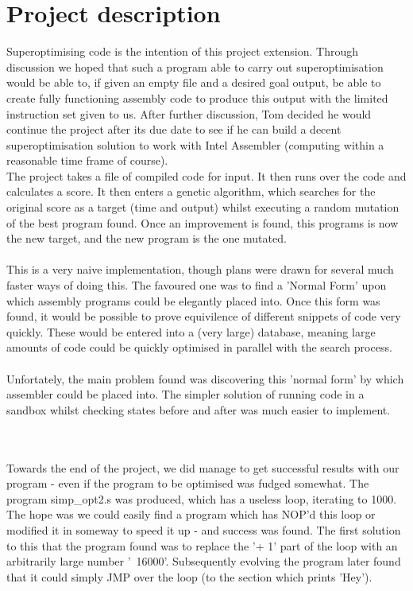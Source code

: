 \documentclass[11pt]{article}
\begin{document}
\section{Project description}
\indent Superoptimising code is the intention of this project extension. Through discussion we hoped that such a program able to carry out superoptimisation would be able to, if given an empty file and a desired goal output, be able to create fully functioning assembly code to produce this output with the limited instruction set given to us. After further discussion, Tom decided he would continue the project after its due date to see if he can build a decent superoptimisation solution to work with Intel Assembler (computing within a reasonable time frame of course). 
\\
\indent The project takes a file of compiled code for input. It then runs over the code and calculates a score. It then enters a genetic algorithm, which searches for the original score as a target (time and output) whilst executing a random mutation of the best program found. Once an improvement is found, this programs is now the new target, and the new program is the one mutated. 
\\
\\\indent This is a very naive implementation, though plans were drawn for several much faster ways of doing this. The favoured one was to find a 'Normal Form' upon which assembly programs could be elegantly placed into. Once this form was found, it would be possible to prove equivilence of different snippets of code very quickly. These would be entered into a (very large) database, meaning large amounts of code could be quickly optimised in parallel with the search process.
\\
\\\indent Unfortately, the main problem found was discovering this 'normal form' by which assembler could be placed into. The simpler solution of running code in a sandbox whilst checking states before and after was much easier to implement.

\\
\\\indent Towards the end of the project, we did manage to get successful results with our program - even if the program to be optimised was fudged somewhat. The program simp_opt2.s was produced, which has a useless loop, iterating to 1000. The hope was we could easily find a program which has NOP'd this loop or modified it in someway to speed it up - and success was found. The first solution to this that the program found was to replace the '+ 1' part of the loop with an arbitrarily large number '~16000'. Subsequently evolving the program later found that it could simply JMP over the loop (to the section which prints 'Hey'). 
\end{document}
